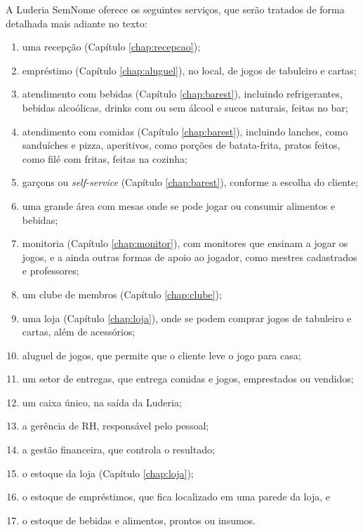 A Luderia SemNome oferece os seguintes serviços, que serão tratados de forma detalhada mais adiante no texto:
\begin{enumerate}
    \item uma recepção (Capítulo \ref{chap:recepcao});
    \item empréstimo (Capítulo \ref{chap:aluguel}), no local, de jogos de tabuleiro e cartas;
    \item atendimento com bebidas (Capítulo \ref{chap:barest}), incluindo refrigerantes, bebidas alcoólicas, drinks com ou sem álcool e sucos naturais, feitas no bar;
    \item atendimento com comidas (Capítulo \ref{chap:barest}), incluindo lanches, como sanduíches e pizza, aperitivos, como porções de batata-frita, pratos feitos, como filé com fritas, feitas na cozinha;
    \item garçons ou \textit{self-service} (Capítulo \ref{chap:barest}), conforme a escolha do cliente;
    \item uma grande área com mesas onde se pode jogar ou consumir alimentos e bebidas;
    \item monitoria (Capítulo \ref{chap:monitor}), com monitores que ensinam a jogar os jogos, e a ainda outras formas de apoio ao jogador, como mestres cadastrados e professores;
    \item um clube de membros (Capítulo \ref{chap:clube});
    \item uma loja (Capítulo \ref{chap:loja}), onde se podem comprar jogos de tabuleiro e cartas, além de acessórios;
    \item aluguel de jogos, que permite que o cliente leve o jogo para casa;
    \item um setor de entregas, que entrega comidas e jogos, emprestados ou vendidos;
    \item um caixa único, na saída da Luderia;
    \item a gerência de RH, responsável pelo pessoal;
    \item a gestão financeira, que controla o resultado;
    \item o estoque da loja (Capítulo \ref{chap:loja});
    \item o estoque de empréstimos, que fica localizado em uma parede da loja, e
    \item o estoque de bebidas e alimentos, prontos ou insumos.
\end{enumerate}


